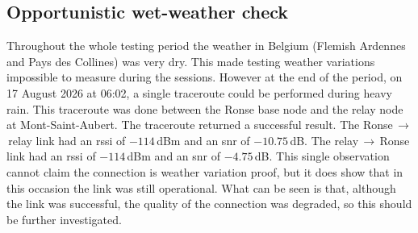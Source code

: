 \subsection{Opportunistic wet-weather check}
\label{sec:poc-rain}

Throughout the whole testing period the weather in Belgium (Flemish Ardennes and Pays des Collines) was very dry. This made testing weather variations impossible to measure during the sessions.
However at the end of the period, on 17 August 2026 at 06:02, a single traceroute could be performed during heavy rain. This traceroute was done between the Ronse base node and the relay node at Mont-Saint-Aubert.
The traceroute returned a successful result. The Ronse\,$\rightarrow$\,relay link had an \gls{rssi} of $-114$\,dBm and an \gls{snr} of $-10.75$\,dB. The relay\,$\rightarrow$\,Ronse link had an \gls{rssi} of $-114$\,dBm and an \gls{snr} of $-4.75$\,dB.
This single observation cannot claim the connection is weather variation proof, but it does show that in this occasion the link was still operational.
What can be seen is that, although the link was successful, the quality of the connection was degraded, so this should be further investigated.